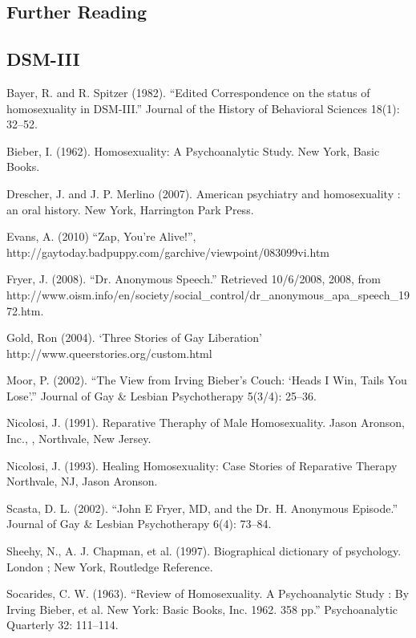 \begin{refsection}
\begin{appendices}
\pagebreak 

\chapter{Further Reading}
\label{furtherreading}

\section{DSM-III}
\label{dsm-iii}

Bayer, R. and R. Spitzer (1982). ``Edited Correspondence on the status of homosexuality in DSM-III.'' Journal of the History of Behavioral Sciences 18(1): 32--52.

Bieber, I. (1962). Homosexuality: A Psychoanalytic Study. New York, Basic Books.

Drescher, J. and J. P. Merlino (2007). American psychiatry and homosexuality : an oral history. New York, Harrington Park Press.

Evans, A. (2010) ``Zap, You're Alive!'', http:\slash \slash gaytoday.badpuppy.com\slash garchive\slash viewpoint\slash 083099vi.htm

Fryer, J. (2008). ``Dr. Anonymous Speech.'' Retrieved 10\slash 6\slash 2008, 2008, from http:\slash \slash www.oism.info\slash en\slash society\slash social\_control\slash dr\_anonymous\_apa\_speech\_1972.htm.

Gold, Ron (2004). `Three Stories of Gay Liberation' http:\slash \slash www.queerstories.org\slash custom.html

Moor, P. (2002). ``The View from Irving Bieber's Couch: `Heads I Win, Tails You Lose'.'' Journal of Gay \& Lesbian Psychotherapy 5(3\slash 4): 25--36.

Nicolosi, J. (1991). Reparative Theraphy of Male Homosexuality. Jason Aronson, Inc., , Northvale, New Jersey.

Nicolosi, J. (1993). Healing Homosexuality: Case Stories of Reparative Therapy Northvale, NJ, Jason Aronson.

Scasta, D. L. (2002). ``John E Fryer, MD, and the Dr. H. Anonymous Episode.'' Journal of Gay \& Lesbian Psychotherapy 6(4): 73--84.

Sheehy, N., A. J. Chapman, et al. (1997). Biographical dictionary of psychology. London ; New York, Routledge Reference.

Socarides, C. W. (1963). ``Review of Homosexuality. A Psychoanalytic Study : By Irving Bieber, et al. New York: Basic Books, Inc. 1962. 358 pp.'' Psychoanalytic Quarterly 32: 111--114.


\end{appendices}
\end{refsection}
